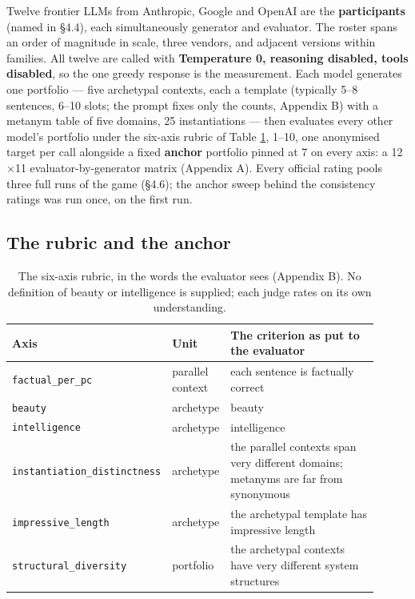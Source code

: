\documentclass{article}
\begin{document}
Twelve frontier LLMs from Anthropic, Google and OpenAI are the \textbf{participants} (named in \S{}4.4), each simultaneously generator and evaluator. The roster spans an order of magnitude in scale, three vendors, and adjacent versions within families. All twelve are called with \textbf{Temperature 0, reasoning disabled, tools disabled}, so the one greedy response is the measurement. Each model generates one portfolio --- five archetypal contexts, each a template (typically 5--8 sentences, 6--10 slots; the prompt fixes only the counts, Appendix B) with a metanym table of five domains, 25 instantiations --- then evaluates every other model's portfolio under the six-axis rubric of Table \ref{tab-rubric}, 1--10, one anonymised target per call alongside a fixed \textbf{anchor} portfolio pinned at 7 on every axis: a 12\ensuremath{\times}11 evaluator-by-generator matrix (Appendix A). Every official rating pools three full runs of the game (\S{}4.6); the anchor sweep behind the consistency ratings was run once, on the first run.

\subsection{The rubric and the anchor}\label{the-rubric-and-the-anchor}

\begin{table}[htb]
\caption{The six-axis rubric, in the words the evaluator sees (Appendix B). No definition of beauty or intelligence is supplied; each judge rates on its own understanding.}
\label{tab-rubric}
\begin{center}\footnotesize
\begin{tabular}{>{\raggedright\arraybackslash}p{0.28\linewidth}>{\raggedright\arraybackslash}p{0.10\linewidth}>{\raggedright\arraybackslash}p{0.53\linewidth}}
\toprule\noalign{}
Axis & Unit & The criterion as put to the evaluator \\
\midrule\noalign{}
\texttt{factual\_\allowbreak{}per\_\allowbreak{}pc} & parallel context & each sentence is factually correct \\
\texttt{beauty} & archetype & beauty \\
\texttt{intelligence} & archetype & intelligence \\
\texttt{instantiation\_\allowbreak{}distinctness} & archetype & the parallel contexts span very different domains; metanyms are far from synonymous \\
\texttt{impressive\_\allowbreak{}length} & archetype & the archetypal template has impressive length \\
\texttt{structural\_\allowbreak{}diversity} & portfolio & the archetypal contexts have very different system structures \\
\bottomrule
\end{tabular}
\end{center}
\end{table}
\end{document}
